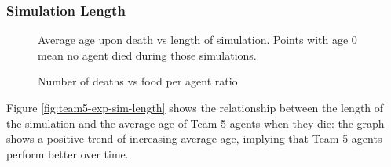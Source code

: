 \subsubsection*{Simulation Length}
\begin{figure}
    \centering
    \begin{minipage}{0.45\textwidth}
            \caption{Average age upon death vs length of simulation. Points with age 0 mean no agent died during those simulations.}
            \label{fig:team5-exp-sim-length}
    \end{minipage}
    \hspace{0.05\textwidth}
    \begin{minipage}{0.45\textwidth}
            \caption{Number of deaths vs food per agent ratio}
            \label{fig:team5-exp-food-per-agent}
    \end{minipage}
\end{figure}
Figure \ref{fig:team5-exp-sim-length} shows the relationship between the length of the simulation and the average age of Team 5 agents when they die: the graph shows a positive trend of increasing average age, implying that Team 5 agents perform better over time.

